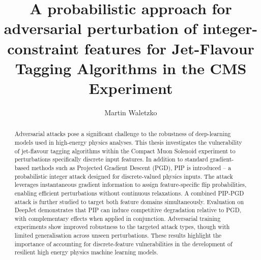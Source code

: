 \documentclass[12pt]{caltech_thesis}
\begin{document}
\title{\textbf{A probabilistic approach for adversarial perturbation of integer-constraint features for Jet-Flavour Tagging Algorithms in the CMS Experiment}}
\author{Martin Waletzko}




\maketitle

\begin{abstract}

Adversarial attacks pose a significant challenge to the robustness of deep-learning models used in high-energy physics analyses. This thesis investigates the vulnerability of jet-flavour tagging algorithms within the Compact Muon Solenoid experiment to perturbations specifically discrete input features. In addition to standard gradient-based methods such as Projected Gradient Descent (PGD), PIP is introduced – a probabilistic integer attack designed for discrete-valued physics inputs. The attack leverages instantaneous gradient information to assign feature-specific flip probabilities, enabling efficient perturbations without continuous relaxations. A combined PIP-PGD attack is further studied to target both feature domains simultaneously. Evaluation on DeepJet demonstrates that PIP can induce competitive degradation relative to PGD, with complementary effects when applied in conjunction. Adversarial training experiments show improved robustness to the targeted attack types, though with limited generalisation across unseen perturbations. These results highlight the importance of accounting for discrete-feature vulnerabilities in the development of resilient high energy physics machine learning models.

\vfill
\noindent{}

\end{abstract}
\end{document}
